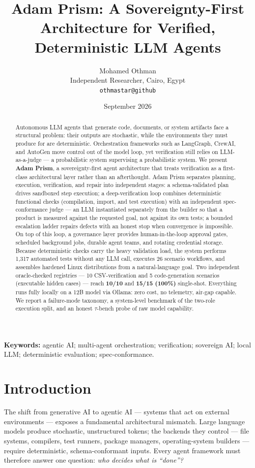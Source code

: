 \documentclass[11pt]{article}
\title{Adam Prism: A Sovereignty-First Architecture for Verified,\\
Deterministic LLM Agents}
\author{Mohamed Othman\\
  Independent Researcher, Cairo, Egypt\\
  \texttt{othmastar@github}}
\date{September 2026}
\begin{document}
\maketitle

\begin{abstract}
Autonomous LLM agents that generate code, documents, or system artifacts face a
structural problem: their outputs are stochastic, while the environments they must
produce for are deterministic. Orchestration frameworks such as LangGraph, CrewAI, and
AutoGen move control out of the model loop, yet verification still relies on
LLM-as-a-judge --- a probabilistic system supervising a probabilistic system. We present
\textbf{Adam Prism}, a sovereignty-first agent architecture that treats verification as a
first-class architectural layer rather than an afterthought. Adam Prism separates
planning, execution, verification, and repair into independent stages: a
schema-validated plan drives sandboxed step execution; a deep-verification loop combines
deterministic functional checks (compilation, import, and test execution) with an
independent spec-conformance judge --- an LLM instantiated separately from the builder so
that a product is measured against the requested goal, not against its own tests; a
bounded escalation ladder repairs defects with an honest stop when convergence is
impossible. On top of this loop, a governance layer provides human-in-the-loop approval
gates, scheduled background jobs, durable agent teams, and rotating credential storage.
Because deterministic checks carry the heavy validation load, the system performs
1{,}317 automated tests without any LLM call, executes 26 scenario workflows, and
assembles hardened Linux distributions from a natural-language goal. Two independent
oracle-checked registries --- 10 CSV-verification and 5 code-generation scenarios
(executable hidden cases) --- reach \textbf{10/10} and \textbf{15/15 (100\%)}
single-shot. Everything runs fully locally on a 12B model via Ollama: zero cost, no
telemetry, air-gap capable. We report a failure-mode taxonomy, a system-level benchmark
of the two-role execution split, and an honest $\tau$-bench probe of raw model capability.
\end{abstract}

\noindent\textbf{Keywords:} agentic AI; multi-agent orchestration; verification;
sovereign AI; local LLM; deterministic evaluation; spec-conformance.

\section{Introduction}\label{sec:intro}
The shift from generative AI to agentic AI --- systems that act on external environments ---
exposes a fundamental architectural mismatch. Large language models produce stochastic,
unstructured tokens; the backends they control --- file systems, compilers, test runners,
package managers, operating-system builders --- require deterministic, schema-conformant
inputs. Every agent framework must therefore answer one question: \emph{who decides what
is ``done''?}
\end{document}
